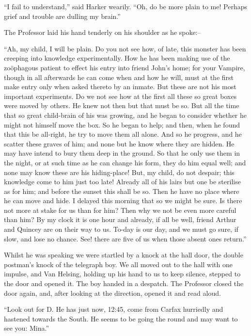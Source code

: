 \documentclass[12pt,openright]{book}
\begin{document}
“I fail to understand,” said Harker wearily. “Oh, do be more plain to me! Perhaps grief and trouble are dulling my brain.”

The Professor laid his hand tenderly on his shoulder as he spoke:–

“Ah, my child, I will be plain. Do you not see how, of late, this monster has been creeping into knowledge experimentally. How he has been making use of the zoöphagous patient to effect his entry into friend John’s home; for your Vampire, though in all afterwards he can come when and how he will, must at the first make entry only when asked thereto by an inmate. But these are not his most important experiments. Do we not see how at the first all these so great boxes were moved by others. He knew not then but that must be so. But all the time that so great child-brain of his was growing, and he began to consider whether he might not himself move the box. So he began to help; and then, when he found that this be all-right, he try to move them all alone. And so he progress, and he scatter these graves of him; and none but he know where they are hidden. He may have intend to bury them deep in the ground. So that he only use them in the night, or at such time as he can change his form, they do him equal well; and none may know these are his hiding-place! But, my child, do not despair; this knowledge come to him just too late! Already all of his lairs but one be sterilise as for him; and before the sunset this shall be so. Then he have no place where he can move and hide. I delayed this morning that so we might be sure. Is there not more at stake for us than for him? Then why we not be even more careful than him? By my clock it is one hour and already, if all be well, friend Arthur and Quincey are on their way to us. To-day is our day, and we must go sure, if slow, and lose no chance. See! there are five of us when those absent ones return.”

Whilst he was speaking we were startled by a knock at the hall door, the double postman’s knock of the telegraph boy. We all moved out to the hall with one impulse, and Van Helsing, holding up his hand to us to keep silence, stepped to the door and opened it. The boy handed in a despatch. The Professor closed the door again, and, after looking at the direction, opened it and read aloud.

“Look out for D. He has just now, 12:45, come from Carfax hurriedly and hastened towards the South. He seems to be going the round and may want to see you: Mina.”
\end{document}
